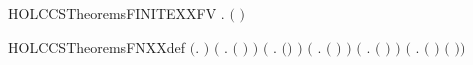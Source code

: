 \newcommand{\HOLCCSTheoremsFINITEXXBV}{\UseVerbatim{HOLCCSTheoremsFINITEXXBV}}
\begin{SaveVerbatim}{HOLCCSTheoremsFINITEXXFV}
\HOLTokenTurnstile{} \HOLSymConst{\HOLTokenForall{}}.  \ensuremath{(} \ensuremath{)}
\end{SaveVerbatim}
\newcommand{\HOLCCSTheoremsFINITEXXFV}{\UseVerbatim{HOLCCSTheoremsFINITEXXFV}}
\begin{SaveVerbatim}{HOLCCSTheoremsFNXXdef}
\HOLTokenTurnstile{} \ensuremath{(}\HOLSymConst{\HOLTokenForall{}}.    \HOLSymConst{\ensuremath{=}} \HOLTokenLeftbrace{}\HOLTokenRightbrace{}\ensuremath{)} \HOLSymConst{\HOLTokenConj{}}
   \ensuremath{(}\HOLSymConst{\HOLTokenForall{}}  .  \ensuremath{(} \HOLSymConst{\ensuremath{\ldotp}}\ensuremath{)}  \HOLSymConst{\ensuremath{=}}     \ensuremath{)} \HOLSymConst{\HOLTokenConj{}}
   \ensuremath{(}\HOLSymConst{\HOLTokenForall{}} .  \ensuremath{(}\HOLConst{\ensuremath{\tau}}\HOLSymConst{\ensuremath{\ldotp}}\ensuremath{)}  \HOLSymConst{\ensuremath{=}}   \ensuremath{)} \HOLSymConst{\HOLTokenConj{}}
   \ensuremath{(}\HOLSymConst{\HOLTokenForall{}}  .  \ensuremath{(} \HOLSymConst{\ensuremath{+}} \ensuremath{)}  \HOLSymConst{\ensuremath{=}}    \HOLConst{\HOLTokenUnion{}}   \ensuremath{)} \HOLSymConst{\HOLTokenConj{}}
   \ensuremath{(}\HOLSymConst{\HOLTokenForall{}}  .  \ensuremath{(} \HOLSymConst{\ensuremath{\mid}} \ensuremath{)}  \HOLSymConst{\ensuremath{=}}    \HOLConst{\HOLTokenUnion{}}   \ensuremath{)} \HOLSymConst{\HOLTokenConj{}}
   \ensuremath{(}\HOLSymConst{\HOLTokenForall{}}  .  \ensuremath{(}  \ensuremath{)}  \HOLSymConst{\ensuremath{=}}     \ensuremath{(} \HOLConst{\HOLTokenUnion{}}   \ensuremath{)}\ensuremath{)} \HOLSymConst{\HOLTokenConj{}}

\end{SaveVerbatim}
